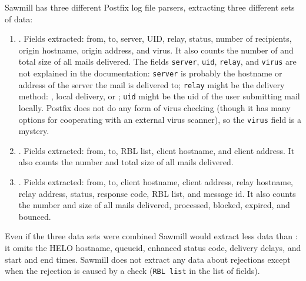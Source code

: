 Sawmill has three different Postfix log file parsers, extracting three
different sets of data:

\begin{enumerate}

    \item {}.
        Fields extracted: from, to, server, UID, relay, status, number of
        recipients, origin hostname, origin  address, and
        virus.  It also counts the number of and total size of all mails
        delivered.  The fields \texttt{server}, \texttt{uid},
        \texttt{relay}, and \texttt{virus} are not explained in the
        documentation: \texttt{server} is probably the hostname or
         address of the server the mail is delivered to;
        \texttt{relay} might be the delivery method: , local
        delivery, or ; \texttt{uid} might be the uid of the
        user submitting mail locally.  Postfix does not do any form of
        virus checking (though it has many options for cooperating with an
        external virus scanner), so the \texttt{virus} field is a mystery.

    \item {}.
        Fields extracted: from, to, RBL list, client hostname, and client
         address.  It also counts the number and total size of
        all mails delivered.

    \item {}.
        Fields extracted: from, to, client hostname, client 
        address, relay hostname, relay  address, status,
        response code, RBL list, and message id.  It also counts the number
        and size of all mails delivered, processed, blocked, expired, and
        bounced.

\end{enumerate}

Even if the three data sets were combined Sawmill would extract less data
than \parsername{}: it omits the HELO hostname, queueid, enhanced status
code, delivery delays, and start and end times.  Sawmill does not extract
any data about rejections except when the rejection is caused by a
 check (\texttt{RBL list} in the list of fields).


